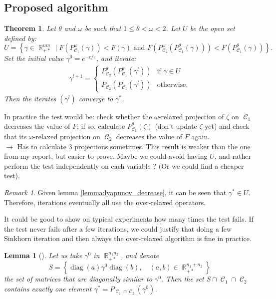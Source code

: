 \documentclass{article} %
\DeclareMathOperator{\IR}{\mathbb{R}}
\DeclareMathOperator{\Ccal}{\mathcal{C}}
\DeclareMathOperator{\diag}{diag}
\renewcommand{\epsilon}{\varepsilon}
\theoremstyle{plain}
\newtheorem{theorem}{Theorem}
\newtheorem{lemma}{Lemma}
\theoremstyle{definition}
\theoremstyle{remark}
\newtheorem{remark}{Remark}
\begin{document}
\subsection{Proposed algorithm}


\begin{theorem}
	Let $\theta$ and $\omega$ be such that $1\le \theta < \omega < 2$. Let $U$ be the open set defined by:
	\begin{equation}\label{eq:open_set_U}
	U = \left\{
	\gamma \in \IR_{+*}^{nm} \mid
	F(P^\omega_{\Ccal_1}(\gamma)) < F(\gamma)
	\text{ and }
	F(P^\omega_{\Ccal_2}(P^\theta_{\Ccal_1}(\gamma))) < F(P^\theta_{\Ccal_1}(\gamma))
	\right\}.
	\end{equation}
	Set the initial value $\gamma^0 = e^{-c/\epsilon}$, and iterate:
	\begin{align*}
	\gamma^{l+1} =
	\begin{cases}
	P^\theta_{\Ccal_2}(P^\theta_{\Ccal_1}(\gamma^l)) & \text{if } \gamma \in U \\
	P_{\Ccal_2}(P_{\Ccal_1}(\gamma^l)) & \text{otherwise.}
	\end{cases}
	\end{align*}
	Then the iterates $(\gamma^l)$ converge to $\gamma^*$.
\end{theorem}
{\color{red} 
	In practice the test would be: check whether the $\omega$-relaxed projection of $\zeta$ on $\Ccal_1$ decreases the value of
	$F$; if so, calculate $P_{\Ccal_1}^\theta(\zeta)$ (don't update $\zeta$ yet) and check that its $\omega$-relaxed projection on $\Ccal_2$ decreases the value of $F$ again. \\
	$\longrightarrow$ Has to calculate 3 projections sometimes. This result is weaker than the one from my report, but easier to prove. Maybe we could avoid having $U$, and rather perform the test independently on each variable ? (Or we could find a cheaper test).}
\begin{remark}
	Given lemma \ref{lemma:lyapunov_decrease}, it can be seen that $\gamma^* \in U$. Therefore, iterations eventually all use the over-relaxed operators.
\end{remark}
{\color{blue} It could be good to show on typical experiments how many times the test fails. If the test never fails after a few iterations, we could justify that doing a few Sinkhorn iteration and then always the over-relaxed algorithm is fine in practice.} 


\begin{lemma}[\cite{cuturi13}]
	\label{lemma:trivial_intersection}
	Let us take $\gamma^0$ in $\IR_{+*}^{n_1 n_2}$,
	and denote
	\[
	S = \left\{
	\diag(a) \gamma^0 \diag(b),\quad
	(a,b) \in \IR_{+*}^{n_1 + n_2}
	\right\}
	\]
	the set of matrices that are diagonally similar to $\gamma^0$.
	Then the set $S \cap \Ccal_1 \cap \Ccal_2$ contains exactly one element $\gamma^* = P_{\Ccal_1 \cap \Ccal_2}(\gamma^0)$.
\end{lemma}
\end{document}
